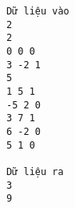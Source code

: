 \begin{verbatim}
Dữ liệu vào
2
2
0 0 0
3 -2 1
5
1 5 1 
-5 2 0
3 7 1
6 -2 0 
5 1 0

Dữ liệu ra
3
9
\end{verbatim}